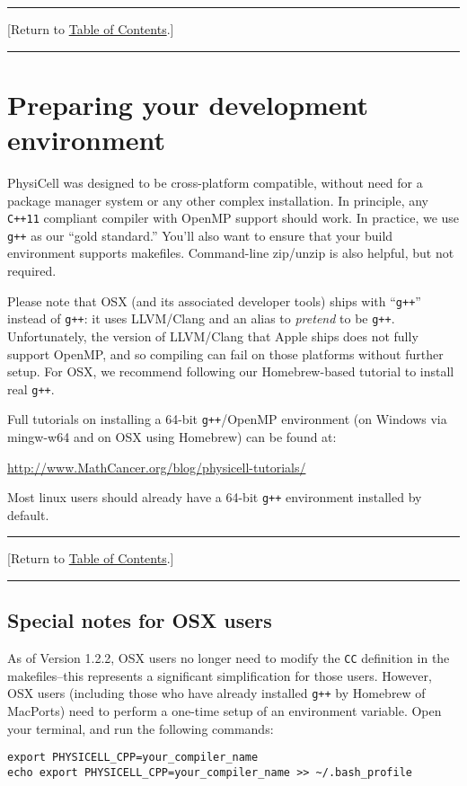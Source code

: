 \documentclass[12pt]{article}
\renewcommand{\v}{\verb}
\newcommand{\blue}[1]{\textcolor{blue}{#1}}
\newcommand{\DONE}{}%
\newcommand{\TOClink}{\begin{center}\hrule\vskip-10pt\phantom{.}\hfill[Return to \hyperlink{TOC}{Table of Contents}.]\hfill\phantom{.}\vskip3pt\hrule\end{center}}
\begin{document}
\TOClink 

\section{Preparing your development environment \DONE}
\label{sec:preparing_environment}
PhysiCell was designed to be cross-platform compatible, without need for a package manager system or any other 
complex installation. In principle, any \v|C++11| compliant compiler with OpenMP support should work. In 
practice, we use \v|g++| as our ``gold standard.'' You'll also want to ensure that your build environment supports 
makefiles. Command-line zip/unzip is also helpful, but not required. 

Please note that OSX (and its associated developer tools) 
ships with ``\v|g++|'' instead of \v|g++|: it uses LLVM/Clang and an alias to \emph{pretend} to be \v|g++|. 
Unfortunately, the version of LLVM/Clang that Apple ships does not fully support OpenMP, and so compiling can 
fail on those platforms without further setup. For OSX, we recommend following our 
Homebrew-based tutorial to install real \v|g++|. 

Full tutorials on installing a 64-bit \v|g++|/OpenMP environment (on Windows via mingw-w64 and on OSX using Homebrew) 
can be found at: 

\href{http://www.mathcancer.org/blog/physicell-tutorials/}{http://www.MathCancer.org/blog/physicell-tutorials/}

Most linux users should already have a 64-bit \v|g++| environment installed by default. 

\TOClink

\subsection{Special notes for OSX users}
\label{sec:osx_setup_note}
As of Version 1.2.2, OSX users no longer need to modify the \v|CC| definition in the makefiles--this 
represents a significant simplification for those users. However, OSX users (including those who 
have already installed \v|g++| by Homebrew of MacPorts) need to perform a one-time setup 
of an environment variable. Open your terminal, and run the following commands: 

\begin{verbatim}
export PHYSICELL_CPP=your_compiler_name
echo export PHYSICELL_CPP=your_compiler_name >> ~/.bash_profile
\end{verbatim}
\end{document}
